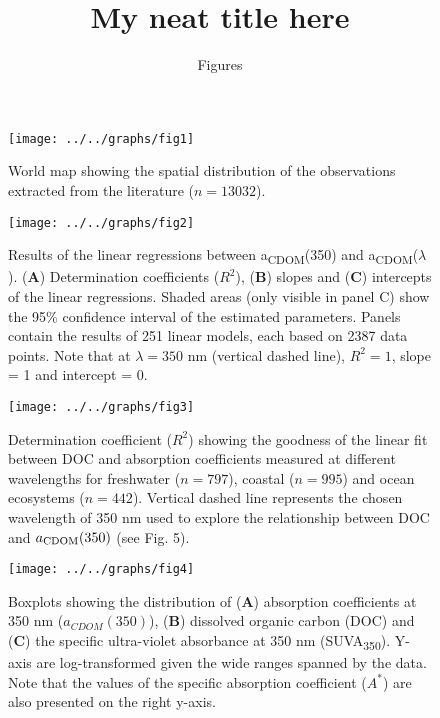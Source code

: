 \documentclass[12pt,a4paper]{scrartcl}
\title{My neat title here}
\subtitle{Figures}
\date{}
\begin{document}
\maketitle

\begin{figure}[h]
	\centering
	\texttt{[image: ../../graphs/fig1]}
	\caption{World map showing the spatial distribution of the observations extracted from the literature ($n = 13032$).}
\end{figure}

\clearpage
\newpage

\begin{figure}[h]
	\centering
	\texttt{[image: ../../graphs/fig2]}
	\caption{Results of the linear regressions between a\textsubscript{CDOM}(350) and a\textsubscript{CDOM}($\lambda$). (\textbf{A}) Determination coefficients ($R^2$), (\textbf{B}) slopes and (\textbf{C}) intercepts of the linear regressions. Shaded areas (only visible in panel C) show the 95\% confidence interval of the estimated parameters. Panels contain the results of 251 linear models, each based on 2387 data points. Note that at $\lambda = 350$ nm (vertical dashed line), $R^2 = 1$, slope = 1 and intercept = 0.}
\end{figure}

\clearpage
\newpage

\begin{figure}[h]
	\centering
	\texttt{[image: ../../graphs/fig3]}
	\caption{Determination coefficient ($R^2$) showing the goodness of the linear fit between DOC and absorption coefficients measured at different wavelengths for freshwater ($n = 797$), coastal ($n = 995$) and ocean ecosystems ($n = 442$). Vertical dashed line represents the chosen wavelength of 350 nm used to explore the relationship between DOC and $a\textsubscript{CDOM}(350)$ (see Fig. 5).}
\end{figure}

\clearpage
\newpage

\begin{figure}[h]
	\centering
	\texttt{[image: ../../graphs/fig4]}
	\caption{Boxplots showing the distribution of (\textbf{A}) absorption coefficients at 350 nm ($a_{CDOM}(350)$), (\textbf{B}) dissolved organic carbon (DOC) and (\textbf{C}) the specific ultra-violet absorbance at 350 nm (SUVA\textsubscript{350}). Y-axis are log-transformed given the wide ranges spanned by the data. Note that the values of the specific absorption coefficient ($A^*$) are also presented on the right y-axis.}
\end{figure}
\end{document}

